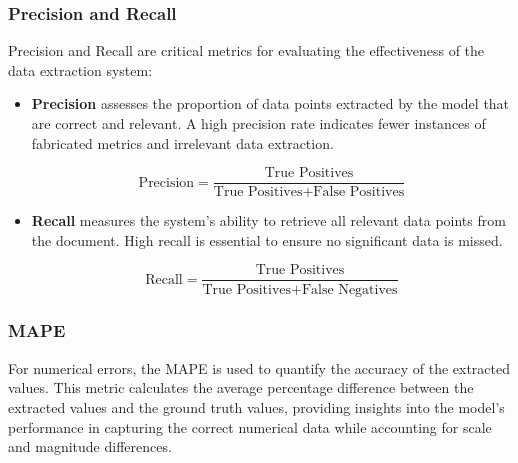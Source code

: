 \documentclass[english, 12pt, a4paper, elec, utf8, a-2b, online]{aaltothesis}
\begin{document}
\subsubsection{Precision and Recall}
Precision and Recall are critical metrics for evaluating the effectiveness of the data extraction system:
\begin{itemize}
    \item \textbf{Precision} assesses the proportion of data points extracted by the model that are correct and relevant. A high precision rate indicates fewer instances of fabricated metrics and irrelevant data extraction.

    \begin{equation}
        \text{Precision} = \frac{\text{True Positives}}{\text{True Positives} + \text{False Positives}}
    \end{equation}

    \item \textbf{Recall} measures the system's ability to retrieve all relevant data points from the document. High recall is essential to ensure no significant data is missed.

    \begin{equation}
        \text{Recall} = \frac{\text{True Positives}}{\text{True Positives} + \text{False Negatives}}
    \end{equation}
\end{itemize}




\subsubsection{MAPE}

For numerical errors, the \ac{MAPE} is used to quantify the accuracy of the extracted values.
This metric calculates the average percentage difference between the extracted values and the ground truth values, providing insights into the model's performance in capturing the correct numerical data while accounting for scale and magnitude differences.
\end{document}

